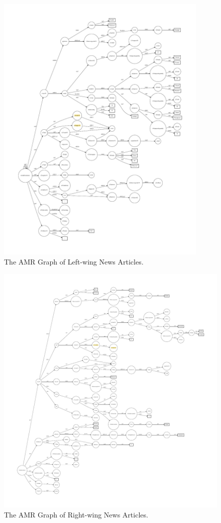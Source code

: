 \begin{figure}[ht]
    \centering
    \captionsetup{justification=centering}
    \includegraphics[width=0.9\textwidth]{img/empirical-amr-left}
    \caption{The AMR Graph of Left-wing News Articles.}
    \label{fig:empirical-amr-left}
\end{figure}
\begin{figure}[ht]
    \centering
    \includegraphics[width=\textwidth]{img/empirical-amr-right}
    \caption{The AMR Graph of Right-wing News Articles.}
    \label{fig:empirical-amr-right}
\end{figure}
